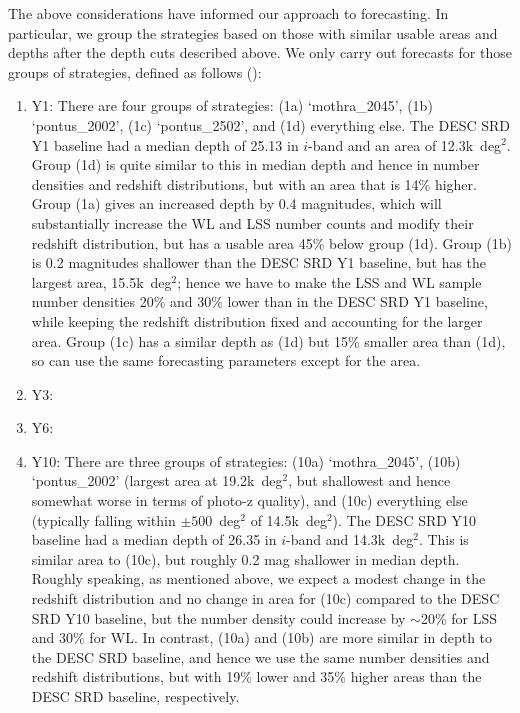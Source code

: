 The above considerations have informed our approach to forecasting.  In particular, we group the
strategies based on those with similar usable areas and depths after the depth cuts described
above.  We only carry out forecasts for those groups of strategies, defined as follows
():
\begin{enumerate}
\item Y1: There are four groups of strategies: (1a) `mothra\_2045', (1b) `pontus\_2002', (1c)
  `pontus\_2502', and (1d) everything else.  The DESC SRD Y1 baseline had a median depth of 25.13 in
  $i$-band and an area of 12.3k~deg$^2$.  Group (1d) is quite similar to this in median depth and
  hence in number densities and redshift distributions, but with an area that is 14\% higher.  Group
  (1a) gives an increased depth by 0.4 magnitudes, which will substantially increase the WL and LSS
  number counts and modify their redshift distribution, but has a usable area 45\% below group (1d).
  Group (1b) is 0.2 magnitudes shallower than the DESC SRD Y1 baseline, but has the largest area,
  15.5k~deg$^2$; hence we have to make the LSS and WL sample number densities 20\% and 30\% lower
  than in the DESC SRD Y1 baseline, while keeping the redshift distribution fixed and accounting for
  the larger area.   Group (1c) has a similar depth as (1d) but 15\% smaller area than (1d), so can
  use the same forecasting parameters except for the area.
\item Y3: \todorm{}
\item Y6: \todorm{}
\item Y10: There are three groups of strategies: (10a) `mothra\_2045', (10b) `pontus\_2002' (largest
  area at 19.2k~deg$^2$, but shallowest and hence somewhat worse in terms of photo-z quality), and (10c)
  everything else (typically falling within $\pm 500$~deg$^2$ of 14.5k~deg$^2$).  The DESC SRD Y10
  baseline had a median depth of 26.35 in $i$-band and 14.3k~deg$^2$.  This is similar area to
  (10c), but roughly 0.2 mag shallower in median depth.  Roughly speaking, as mentioned above, we
  expect a modest change in the redshift distribution and no change in area for (10c) compared to
  the DESC SRD Y10 baseline, but the number density could increase by $\sim$20\% for LSS and $30$\%
  for WL.  In contrast, (10a) and (10b) are more similar in depth to the DESC SRD baseline, and
  hence we use the same number densities and redshift distributions, but with 19\% lower and 35\%
  higher areas than the DESC SRD baseline, respectively.
\end{enumerate}


